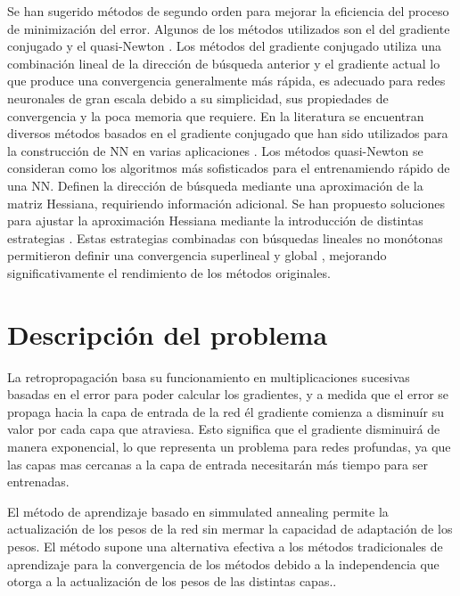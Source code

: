 Se han sugerido métodos de segundo orden  para mejorar la eficiencia del proceso de minimización del error. Algunos de los métodos utilizados son el del gradiente conjugado \cite{Fletcher1964, Hestenes1952, Polak1969} y el quasi-Newton \cite{Huang1970, Nocedal2006}. Los métodos del gradiente conjugado utiliza una combinación lineal de la dirección de búsqueda anterior y el gradiente actual lo que produce una convergencia generalmente más rápida, es adecuado para redes neuronales de gran escala debido a su simplicidad, sus propiedades de convergencia y la poca memoria que requiere. En la literatura  se encuentran diversos métodos basados en el gradiente conjugado \cite{Birgin2001, Moller1993} que han sido utilizados para la construcción de NN en varias aplicaciones \cite{Charalambous1992, Peng2007, Sotiropoulos2002}. Los métodos quasi-Newton se consideran como los algoritmos más sofisticados para el entrenamiendo rápido de una NN. Definen la dirección de búsqueda mediante una aproximación de la matriz Hessiana, requiriendo información adicional. Se han propuesto soluciones para ajustar la aproximación Hessiana mediante la introducción de distintas estrategias \cite{Al-Baali1998, Nocedal1993, Oren1972, Oren1974, Yin2007}. Estas estrategias combinadas con búsquedas lineales no monótonas permitieron definir una convergencia superlineal y global \cite{Yin2007}, mejorando significativamente el rendimiento de los métodos originales.









\section{Descripción del problema}
La retropropagación basa su funcionamiento en multiplicaciones sucesivas basadas en el error para poder calcular los gradientes, y a medida que el error se propaga hacia la capa de entrada de la red él gradiente comienza a disminuír su valor por cada capa que atraviesa. Esto significa que el gradiente disminuirá de manera exponencial, lo que representa un problema para redes profundas, ya que las capas mas cercanas a la capa de entrada necesitarán más tiempo para ser entrenadas.

El método de aprendizaje basado en simmulated annealing permite la actualización de los pesos de la red sin mermar la capacidad de adaptación de los pesos. El método supone una alternativa efectiva a los métodos tradicionales de aprendizaje para la convergencia de los métodos debido a la independencia que otorga a la actualización de los pesos de las distintas capas..


